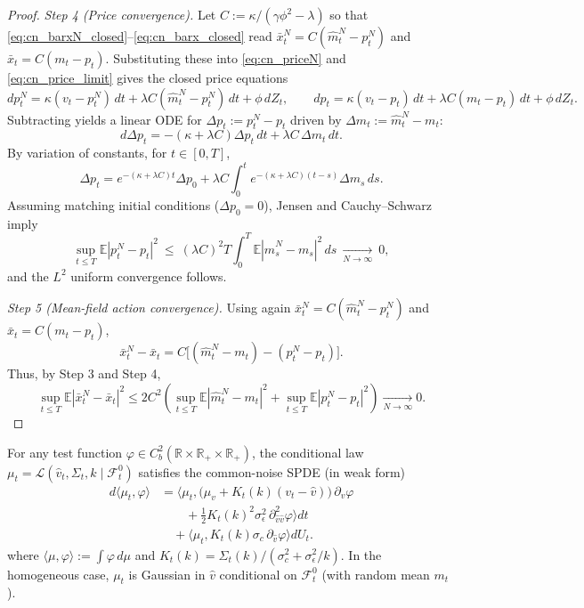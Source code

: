 \begin{proof}
\emph{Step 4 (Price convergence).}
Let $C:=\kappa/(\gamma\phi^2-\lambda)$ so that \eqref{eq:cn_barxN_closed}--\eqref{eq:cn_barx_closed} read
$\bar x^N_t=C(\hat m^N_t-p^N_t)$ and $\bar x_t=C(m_t-p_t)$. Substituting these into
\eqref{eq:cn_priceN} and \eqref{eq:cn_price_limit} gives the closed price equations
\[
dp^N_t = \kappa(v_t-p^N_t)\,dt + \lambda C(\hat m^N_t-p^N_t)\,dt + \phi\,dZ_t,
\qquad
dp_t = \kappa(v_t-p_t)\,dt + \lambda C(m_t-p_t)\,dt + \phi\,dZ_t.
\]
Subtracting yields a linear ODE for $\Delta p_t:=p^N_t-p_t$ driven by $\Delta m_t:=\hat m^N_t-m_t$:
\[
d\Delta p_t = -(\kappa+\lambda C)\Delta p_t\,dt + \lambda C\,\Delta m_t\,dt.
\]
By variation of constants, for $t\in[0,T]$,
\[
\Delta p_t = e^{-(\kappa+\lambda C)t}\Delta p_0 + \lambda C\int_0^t e^{-(\kappa+\lambda C)(t-s)}\Delta m_s\,ds.
\]
Assuming matching initial conditions ($\Delta p_0=0$), Jensen and Cauchy--Schwarz imply
\[
\sup_{t\le T}\mathbb E|p^N_t-p_t|^2
 \ \le\ (\lambda C)^2 T \int_0^T \mathbb E|\hat m^N_s-m_s|^2\,ds
 \ \xrightarrow[N\to\infty]{}\ 0,
 \]
and the $L^2$ uniform convergence follows.

\emph{Step 5 (Mean-field action convergence).}
Using again $\bar x^N_t=C(\hat m^N_t-p^N_t)$ and $\bar x_t=C(m_t-p_t)$,
\[
\bar x^N_t-\bar x_t
=C\bigl[(\hat m^N_t-m_t)-(p^N_t-p_t)\bigr].
\]
Thus, by Step 3 and Step 4,
\[
\sup_{t\le T}\mathbb E|\bar x^N_t-\bar x_t|^2
\le 2C^2\left(\sup_{t\le T}\mathbb E|\hat m^N_t-m_t|^2+\sup_{t\le T}\mathbb E|p^N_t-p_t|^2\right)
\xrightarrow[N\to\infty]{}0.
\]
\end{proof}

\begin{remark}\label{rem:cn_spde}
For any test function $\varphi\in C_b^2(\mathbb R\times \mathbb R_+\times \mathbb R_+)$,
the conditional law $\mu_t=\mathcal L(\hat v_t,\Sigma_t,k\mid \mathcal F^0_t)$ satisfies the common-noise SPDE
(in weak form)
\[
\begin{aligned}
d\langle \mu_t,\varphi\rangle
&= \Big\langle \mu_t,\bigl(\mu_v + K_t(k)(v_t-\hat v)\bigr)\,\partial_{\hat v}\varphi\\
&\qquad +\tfrac{1}{2} K_t(k)^2\sigma_\epsilon^2\,\partial^2_{\hat v\hat v}\varphi\Big\rangle dt\\
&\quad +\Big\langle \mu_t, K_t(k)\sigma_c\,\partial_{\hat v}\varphi\Big\rangle dU_t.
\end{aligned}
\]
where $\langle\mu,\varphi\rangle:=\int \varphi\,d\mu$ and
$K_t(k)=\Sigma_t(k)/(\sigma_c^2+\sigma_\epsilon^2/k)$.
In the homogeneous case, $\mu_t$ is Gaussian in $\hat v$ conditional on $\mathcal F^0_t$ (with random mean $m_t$).
\end{remark}
